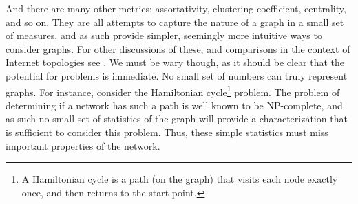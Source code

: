 









And there are many other metrics: assortativity, clustering
coefficient, centrality, and so on. They are all attempts to capture
the nature of a graph in a small set of measures, and as such provide
simpler, seemingly more intuitive ways to consider graphs.  For other
discussions of these, and comparisons in the context of Internet
topologies see \cite{jamakovic08,haddadi08:_networ_topol}.  We must be
wary though, as it should be clear that the potential for problems is
immediate. No small set of numbers can truly represent graphs. For
instance, consider the Hamiltonian cycle\footnote{A Hamiltonian cycle
  is a path (on the graph) that visits each node exactly once, and
  then returns to the start point.} problem. The problem of
determining if a network has such a path is well known to be
NP-complete, and as such no small set of statistics of the graph will
provide a characterization that is sufficient to consider this
problem. Thus, these simple statistics must miss important properties
of the network.

